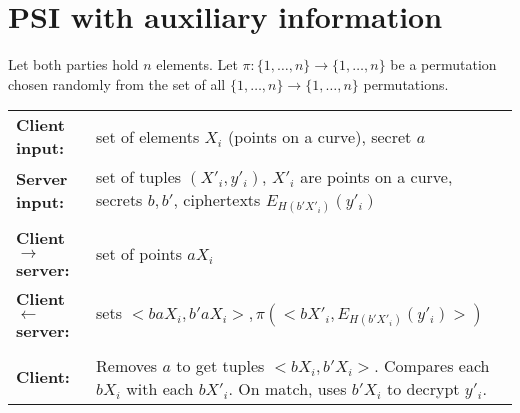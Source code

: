 \documentclass{article}
\newcommand{\la}[0]{$\leftarrow$\xspace}
\newcommand{\ra}[0]{$\rightarrow$\xspace}
\begin{document}
\section{PSI with auxiliary information}
Let both parties hold $n$ elements. Let
$\pi:\{1,\ldots,n\}\rightarrow\{1,\ldots,n\}$ be a permutation chosen
randomly from the set of all $\{1,\ldots,n\}\rightarrow\{1,\ldots,n\}$
permutations.

\begin{tabularx}{\columnwidth}{>{\bf}lX}
{Client input:}& set of elements $X_i$ (points on a curve), secret $a$
\\{Server input:}& set of tuples $(X'_i,y'_i)$, $X'_i$ are points on a
curve, secrets $b,b'$, ciphertexts $E_{H(b'X'_i)}(y'_i)$
 \\\\Client \ra server:& set of points $aX_i$
 \\Client \la server:& sets  $<baX_i,b'aX_i>,\pi(<bX'_i,E_{H(b'X'_i)}(y'_i)>)$
\\\\Client:&Removes $a$ to get tuples $<bX_i,b'X_i>$. Compares each $bX_i$ with each $bX'_i$. On match, uses $b'X_i$ to decrypt $y'_i$.
\end{tabularx}
\end{document}
